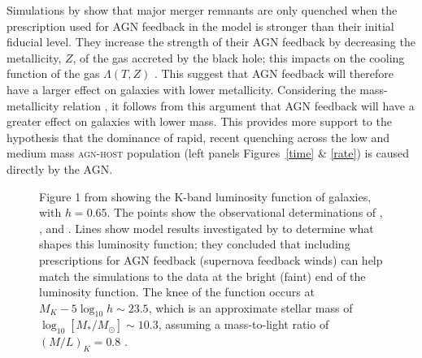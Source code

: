 Simulations by \cite{sparre16} show that major merger remnants are only quenched when the prescription used for AGN feedback in the model is stronger than their initial fiducial level. They increase the strength of their AGN feedback by decreasing the metallicity, $Z$, of the gas accreted by the black hole; this impacts on the cooling function of the gas $\Lambda(T, Z)$ \citep[see Section 2.1 of][]{sparre16}. This suggest that AGN feedback will therefore have a larger effect on galaxies with lower metallicity. Considering the mass-metallicity relation \citep{tremonti04}, it follows from this argument that AGN feedback will have a greater effect on galaxies with lower mass. This provides more support to the hypothesis that the dominance of rapid, recent quenching across the low and medium mass \textsc{agn-host} population (left panels Figures~\ref{time} \& \ref{rate}) is caused directly by the AGN.

 \begin{figure}
\caption[Galaxy luminosity function from observations and simulations: Figure 1 of \cite{benson03}]{Figure 1 from \cite{benson03} showing the K-band luminosity function of galaxies, with $h=0.65$. The points show the observational determinations of \cite[][circles]{cole01}, \cite[][squares]{kochanek01}, and \cite[][$z < 0.1$, stars]{huang03}. Lines show model results investigated by \cite{benson03} to determine what shapes this luminosity function; they concluded that including prescriptions for AGN feedback (supernova feedback winds) can help match the simulations to the data at the bright (faint) end of the luminosity function. The knee of the function occurs at $M_K -5\log_{10} h \sim 23.5$, which is an approximate stellar mass of $\log_{10}[M_*/M_{\odot}] \sim 10.3$, assuming a mass-to-light ratio of $(M/L)_K = 0.8$ \citep{brinchmann00}.}
\label{lumfunc}
\end{figure}

